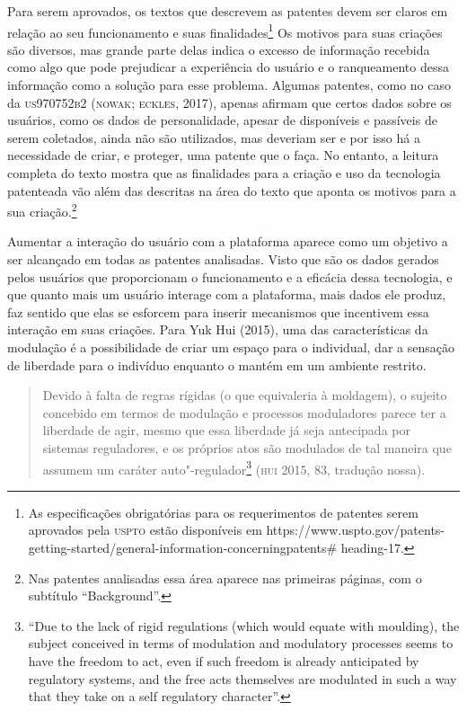 Para serem aprovados, os textos que descrevem as patentes devem ser
claros em relação ao seu funcionamento e suas finalidades\footnote{As
  especificações obrigatórias para os requerimentos de patentes serem
  aprovados pela \textsc{uspto}
  estão disponíveis em
  https://www.uspto.gov/patents-getting-started/general-information-concerningpatents\#
  heading-17.} Os motivos para suas criações são diversos, mas grande
parte delas indica o excesso de informação recebida como algo que pode
prejudicar a experiência do usuário e o ranqueamento dessa informação
como a solução para esse problema. Algumas patentes, como no caso da
\textsc{us970752b2} (\textsc{nowak}; \textsc{eckles}, 2017), apenas afirmam que certos dados sobre
os usuários, como os dados de personalidade, apesar de disponíveis e
passíveis de serem coletados, ainda não são utilizados, mas deveriam ser
e por isso há a necessidade de criar, e proteger, uma patente que o
faça. No entanto, a leitura completa do texto mostra que as finalidades
para a criação e uso da tecnologia patenteada vão além das descritas na
área do texto que aponta os motivos para a sua criação.\footnote{Nas
  patentes analisadas essa área aparece nas primeiras páginas, com o
  subtítulo ``Background''.}

Aumentar a interação do usuário com a plataforma aparece como um
objetivo a ser alcançado em todas as patentes analisadas. Visto que são
os dados gerados pelos usuários que proporcionam o funcionamento e a
eficácia dessa tecnologia, e que quanto mais um usuário interage com a
plataforma, mais dados ele produz, faz sentido que elas se esforcem para
inserir mecanismos que incentivem essa interação em suas criações. Para
Yuk Hui (2015), uma das características da modulação é a possibilidade
de criar um espaço para o individual, dar a sensação de liberdade para o
indivíduo enquanto o mantém em um ambiente restrito.

\begin{quote}
Devido à falta de regras rígidas (o que equivaleria à moldagem), o
sujeito concebido em termos de modulação e processos moduladores parece
ter a liberdade de agir, mesmo que essa liberdade já seja antecipada por
sistemas reguladores, e os próprios atos são modulados de tal maneira
que assumem um caráter auto"-regulador\footnote{``Due to the lack of
  rigid regulations (which would equate with moulding), the subject
  conceived in terms of modulation and modulatory processes seems to
  have the freedom to act, even if such freedom is already anticipated
  by regulatory systems, and the free acts themselves are modulated in
  such a way that they take on a self regulatory character''.} (\textsc{hui}
2015, 83, tradução nossa).
\end{quote}

